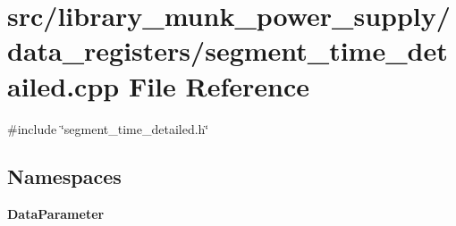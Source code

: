 \section{src/library\+\_\+munk\+\_\+power\+\_\+supply/data\+\_\+registers/segment\+\_\+time\+\_\+detailed.cpp File Reference}
\label{segment__time__detailed_8cpp}
{\ttfamily \#include \char`\"{}segment\+\_\+time\+\_\+detailed.\+h\char`\"{}}\newline
\subsection*{Namespaces}
\begin{DoxyCompactItemize}
\item 
 \textbf{ Data\+Parameter}
\end{DoxyCompactItemize}

